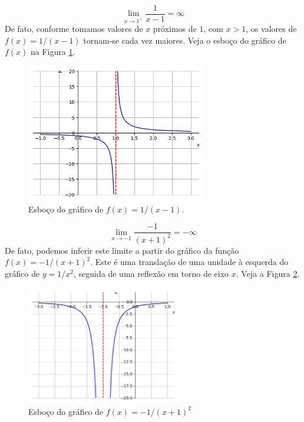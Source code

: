 \cleardoublepage\documentclass[../main.tex]{subfiles}
\begin{document}
\begin{ex}
  \begin{equation*}
    \lim_{x\to 1^+} \frac{1}{x-1} = \infty
  \end{equation*}
  De fato, conforme tomamos valores de $x$ próximos de $1$, com $x>1$, os valores de $f(x) = 1/(x-1)$ tornam-se cada vez maiores. Veja o esboço do gráfico de $f(x)$ na Figura \ref{fig:ex_liminf_1x}.

\begin{figure}[H]
  \centering
  \includegraphics[width=0.7\textwidth]{fig_lim/fig_ex_liminf_1x}
  \caption{Esboço do gráfico de $f(x)=1/(x-1)$.}
  \label{fig:ex_liminf_1x}
\end{figure}  
\end{ex}

\begin{ex}
  \begin{equation*}
    \lim_{x\to -1} \frac{-1}{(x+1)^2} = -\infty
  \end{equation*}
  De fato, podemos inferir este limite a partir do gráfico da função $f(x) = -1/(x+1)^2$. Este é uma translação de uma unidade à esquerda do gráfico de $y = 1/x^2$, seguida de uma reflexão em torno de eixo $x$. Veja a Figura \ref{fig:ex_liminf-1x2}.

  \begin{figure}[H]
    \centering
    \includegraphics[width=0.6\textwidth]{fig_lim/fig_ex_liminf-1x2}
    \caption{Esboço do gráfico de $f(x)=-1/(x+1)^2$}
    \label{fig:ex_liminf-1x2}
  \end{figure}
\end{ex}
\end{document}
